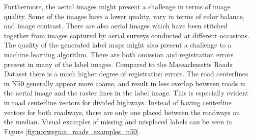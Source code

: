 Furthermore, the aerial images might present a challenge in terms of image quality. Some of the images have a lower quality, vary in terms of color balance, and image contrast. There are also aerial images which have been stitched together from images captured by aerial surveys conducted at different occasions.\\

The quality of the generated label maps might also present a challenge to a machine learning algorithm. There are both omission and registration errors present in many of the label images. Compared to the Massachusetts Roads Dataset there is a much higher degree of registration errors. The road centerlines in N50 generally appear more coarse, and result in less overlap between roads in the aerial image and the raster lines in the label image. This is especially evident in road centerline vectors for divided highways. Instead of having centerline vectors for both roadways, there are only one placed between the roadways on the median. Visual examples of missing and misplaced labels can be seen in Figure \ref{fig:norwegian_roads_examples_n50}.\\

